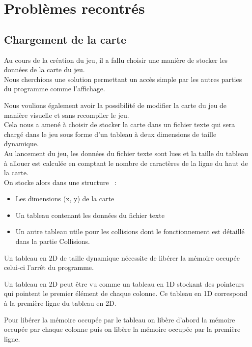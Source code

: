 \documentclass[12pt]{article}
\begin{document}
	\section{Problèmes recontrés}

		\subsection{Chargement de la carte}
		
			Au cours de la création du jeu, il a fallu choisir une manière de stocker les données de la carte du jeu.\\


			Nous cherchions une solution permettant un accès simple par les autres parties du programme comme l’affichage.
		
			Nous voulions également avoir la possibilité de modifier la carte du jeu de manière visuelle et sans recompiler le jeu.\\


			Cela nous a amené à choisir de stocker la carte dans un fichier texte qui sera chargé dans le jeu sous forme 
			d’un tableau à deux dimensions de taille dynamique.\\
		
			Au lancement du jeu, les données du fichier texte sont lues et la taille du tableau à allouer est calculée en 
			comptant le nombre de caractères de la ligne du haut de la carte.\\
		
			On stocke alors dans une structure  :
			\begin{itemize}
				\item Les dimensions (x, y) de la carte
				\item Un tableau contenant les données du fichier texte
				\item Un autre tableau utile pour les collisions dont le fonctionnement est détaillé dans la partie Collisions.
			\end{itemize}
		
			Un tableau en 2D de taille dynamique nécessite de libérer la mémoire occupée celui-ci l’arrêt du programme.
		
			Un tableau en 2D peut être vu comme un tableau en 1D stockant des pointeurs qui pointent le premier élément 
			de chaque colonne. Ce tableau en 1D correspond à la première ligne du tableau en 2D.
		
			Pour libérer la mémoire occupée par le tableau on libère d’abord la mémoire occupée par chaque colonne puis 
			on libère la mémoire occupée par la première ligne.
		
\end{document}
